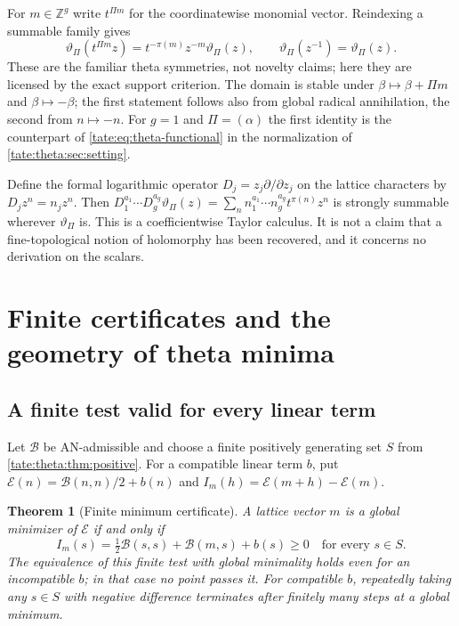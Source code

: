 \documentclass[11pt,letterpaper]{article}
\newtheorem{theorem}{Theorem}[section]
\theoremstyle{definition}
\newcommand{\Z}{\mathbb Z}
\newcommand{\cB}{\mathcal B}
\newcommand{\cE}{\mathcal E}
\begin{document}
For $m\in\Z^g$ write $t^{\Pi m}$ for the coordinatewise monomial vector.
Reindexing a summable family gives
\begin{equation}
 \vartheta_\Pi(t^{\Pi m}z)=t^{-\pi(m)}z^{-m}\vartheta_\Pi(z),
 \qquad \vartheta_\Pi(z^{-1})=\vartheta_\Pi(z).\label{tate:theta:eq:quasiperiod}
\end{equation}
These are the familiar theta symmetries, not novelty claims; here they are
licensed by the exact support criterion. The domain is stable under
$\beta\mapsto\beta+\Pi m$ and $\beta\mapsto-\beta$; the first statement
follows also from global radical annihilation, the second from
$n\mapsto-n$. For $g=1$ and $\Pi=(\alpha)$ the first identity is the
counterpart of \eqref{tate:eq:theta-functional} in the normalization of
\cref{tate:theta:sec:setting}.

Define the formal logarithmic operator $D_j=z_j\partial/\partial z_j$ on
the lattice characters by $D_jz^n=n_jz^n$. Then
$D_1^{a_1}\cdots D_g^{a_g}\vartheta_\Pi(z)
=\sum_nn_1^{a_1}\cdots n_g^{a_g}t^{\pi(n)}z^n$ is strongly summable
wherever $\vartheta_\Pi$ is. This is a coefficientwise Taylor calculus. It
is not a claim that a fine-topological notion of holomorphy has been
recovered, and it concerns no derivation on the scalars.

\section{Finite certificates and the geometry of theta minima}\label{tate:theta:sec:certificates}

\subsection{A finite test valid for every linear term}

Let $\cB$ be AN-admissible and choose a finite positively generating set
$S$ from \cref{tate:theta:thm:positive}. For a compatible linear term $b$,
put $\cE(n)=\cB(n,n)/2+b(n)$ and $I_m(h)=\cE(m+h)-\cE(m)$.

\begin{theorem}[Finite minimum certificate]\label{tate:theta:thm:certificate}
A lattice vector $m$ is a global minimizer of $\cE$ if and only if
\begin{equation}
 I_m(s)=\tfrac12\cB(s,s)+\cB(m,s)+b(s)\ge0
 \quad\text{for every }s\in S.\label{tate:theta:eq:cert}
\end{equation}
The equivalence of this finite test with global minimality holds even for
an incompatible $b$; in that case no point passes it. For compatible $b$,
repeatedly taking any $s\in S$ with negative difference terminates after
finitely many steps at a global minimum.
\end{theorem}
\end{document}
